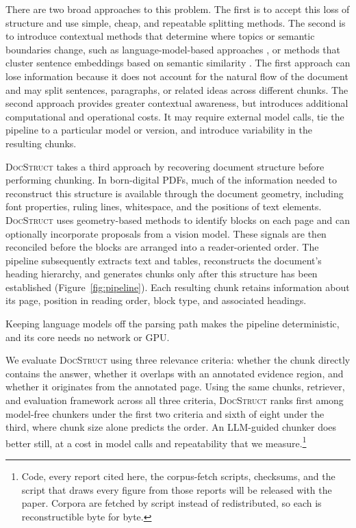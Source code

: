 \documentclass[11pt]{article}
\newcommand{\ds}{\textsc{DocStruct}}
\begin{document}
There are two broad approaches to this problem. The first is to accept this loss of structure and use simple, cheap, and repeatable splitting methods. The second is to introduce contextual methods that determine where topics or semantic boundaries change, such as language-model-based approaches \citep{duarte2024lumberchunker}, or methods that cluster sentence embeddings based on semantic similarity \citep{smith2024chunking}. The first approach can lose information because it does not account for the natural flow of the document and may split sentences, paragraphs, or related ideas across different chunks. The second approach provides greater contextual awareness, but introduces additional computational and operational costs. It may require external model calls, tie the pipeline to a particular model or version, and introduce variability in the resulting chunks.

\ds{} takes a third approach by recovering document structure before performing chunking. In born-digital PDFs, much of the information needed to reconstruct this structure is available through the document geometry, including font properties, ruling lines, whitespace, and the positions of text elements. \ds{} uses geometry-based methods to identify blocks on each page and can optionally incorporate proposals from a vision model. These signals are then reconciled before the blocks are arranged into a reader-oriented order. The pipeline subsequently extracts text and tables, reconstructs the document's heading hierarchy, and generates chunks only after this structure has been established (Figure~\ref{fig:pipeline}). Each resulting chunk retains information about its page, position in reading order, block type, and associated headings.

Keeping language models off the parsing path makes the pipeline deterministic, and its core needs no network or GPU.

We evaluate \ds{} using three relevance criteria: whether the chunk directly contains the answer, whether it overlaps with an annotated evidence region, and whether it originates from the annotated page. Using the same chunks, retriever, and evaluation framework across all three criteria, \ds{} ranks first among model-free chunkers under the first two criteria and sixth of eight under the third, where chunk size alone predicts the order. An LLM-guided chunker does better still, at a cost in model calls and repeatability that we measure.\footnote{Code, every report cited here, the corpus-fetch scripts, checksums, and the script that draws every figure from those reports will be released with the paper. Corpora are fetched by script instead of redistributed, so each is reconstructible byte for byte.}
\end{document}
